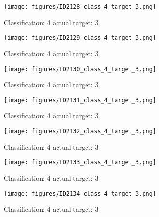 \begin{figure}[h!]
\begin{center}
\texttt{[image: figures/ID2128\_class\_4\_target\_3.png]}
\end{center}
\caption{ Classification: 4 actual target: 3}
\label{fig:ID2128_class_4_target_3}
\end{figure}
\begin{figure}[h!]
\begin{center}
\texttt{[image: figures/ID2129\_class\_4\_target\_3.png]}
\end{center}
\caption{ Classification: 4 actual target: 3}
\label{fig:ID2129_class_4_target_3}
\end{figure}
\begin{figure}[h!]
\begin{center}
\texttt{[image: figures/ID2130\_class\_4\_target\_3.png]}
\end{center}
\caption{ Classification: 4 actual target: 3}
\label{fig:ID2130_class_4_target_3}
\end{figure}
\begin{figure}[h!]
\begin{center}
\texttt{[image: figures/ID2131\_class\_4\_target\_3.png]}
\end{center}
\caption{ Classification: 4 actual target: 3}
\label{fig:ID2131_class_4_target_3}
\end{figure}
\begin{figure}[h!]
\begin{center}
\texttt{[image: figures/ID2132\_class\_4\_target\_3.png]}
\end{center}
\caption{ Classification: 4 actual target: 3}
\label{fig:ID2132_class_4_target_3}
\end{figure}
\begin{figure}[h!]
\begin{center}
\texttt{[image: figures/ID2133\_class\_4\_target\_3.png]}
\end{center}
\caption{ Classification: 4 actual target: 3}
\label{fig:ID2133_class_4_target_3}
\end{figure}
\begin{figure}[h!]
\begin{center}
\texttt{[image: figures/ID2134\_class\_4\_target\_3.png]}
\end{center}
\caption{ Classification: 4 actual target: 3}
\label{fig:ID2134_class_4_target_3}
\end{figure}
